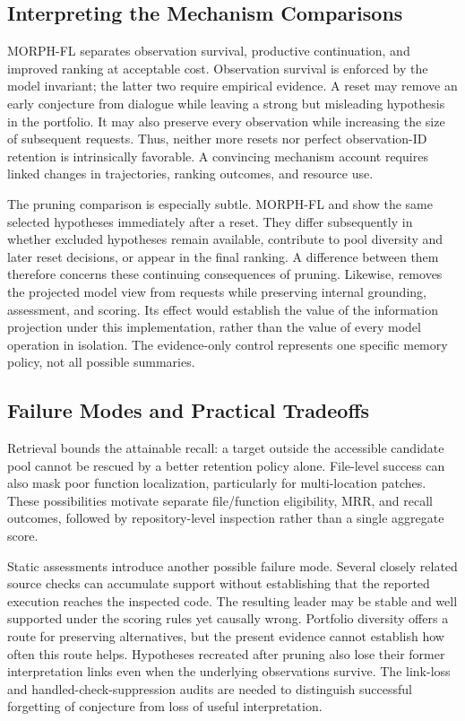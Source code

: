 \documentclass[letterpaper,journal]{IEEEtran}
\newcommand{\code}[1]{\texttt{\detokenize{#1}}}
\begin{document}
\subsection{Interpreting the Mechanism Comparisons}
MORPH-FL separates observation survival, productive continuation, and improved ranking at acceptable cost. Observation survival is enforced by the model invariant; the latter two require empirical evidence. A reset may remove an early conjecture from dialogue while leaving a strong but misleading hypothesis in the portfolio. It may also preserve every observation while increasing the size of subsequent requests. Thus, neither more resets nor perfect observation-ID retention is intrinsically favorable. A convincing mechanism account requires linked changes in trajectories, ranking outcomes, and resource use.

The pruning comparison is especially subtle. MORPH-FL and \code{context_only} show the same selected hypotheses immediately after a reset. They differ subsequently in whether excluded hypotheses remain available, contribute to pool diversity and later reset decisions, or appear in the final ranking. A difference between them therefore concerns these continuing consequences of pruning. Likewise, \code{no_mde} removes the projected model view from requests while preserving internal grounding, assessment, and scoring. Its effect would establish the value of the information projection under this implementation, rather than the value of every model operation in isolation. The evidence-only control represents one specific memory policy, not all possible summaries.

\subsection{Failure Modes and Practical Tradeoffs}
Retrieval bounds the attainable recall: a target outside the accessible candidate pool cannot be rescued by a better retention policy alone. File-level success can also mask poor function localization, particularly for multi-location patches. These possibilities motivate separate file/function eligibility, MRR, and recall outcomes, followed by repository-level inspection rather than a single aggregate score.

Static assessments introduce another possible failure mode. Several closely related source checks can accumulate support without establishing that the reported execution reaches the inspected code. The resulting leader may be stable and well supported under the scoring rules yet causally wrong. Portfolio diversity offers a route for preserving alternatives, but the present evidence cannot establish how often this route helps. Hypotheses recreated after pruning also lose their former interpretation links even when the underlying observations survive. The link-loss and handled-check-suppression audits are needed to distinguish successful forgetting of conjecture from loss of useful interpretation.
\end{document}
